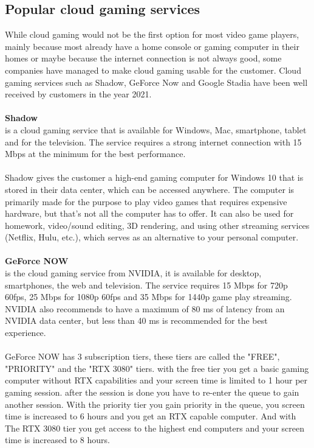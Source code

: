 \subsection{Popular cloud gaming services}
While cloud gaming would not be the first option for most video game players, mainly because most already have a home console or gaming computer in their homes or maybe because the internet connection is not always good, some companies have managed to make cloud gaming usable for the customer. Cloud gaming services such as Shadow, GeForce Now and Google Stadia have been well received by customers in the year 2021.\\\\
\textbf{Shadow}\\
 is a cloud gaming service that is available for Windows, Mac, smartphone, tablet and for the television. The service requires a strong internet connection with 15 Mbps at the minimum for the best performance.\\\\
Shadow gives the customer a high-end gaming computer for Windows 10 that is stored in their data center, which can be accessed anywhere. The computer is primarily made for the purpose to play video games that requires expensive hardware, but that's not all the computer has to offer. It can also be used for homework, video/sound editing, 3D rendering, and using other streaming services (Netflix, Hulu, etc.), which serves as an alternative to your personal computer.\\\\
\textbf{GeForce NOW}\\
 is the cloud gaming service from NVIDIA, it is available for desktop, smartphones, the web and television. The service requires 15 Mbps for 720p 60fps, 25 Mbps for 1080p 60fps and 35 Mbps for 1440p game play streaming. NVIDIA also recommends to have a maximum of 80 ms of latency from an NVIDIA data center, but less than 40 ms is recommended for the best experience.\\\\
GeForce NOW has 3 subscription tiers, these tiers are called the "FREE", "PRIORITY" and the "RTX 3080" tiers. with the free tier you get a basic gaming computer without RTX capabilities and your screen time is limited to 1 hour per gaming session. after the session is done you have to re-enter the queue to gain another session. With the priority tier you gain priority in the queue, you screen time is increased to 6 hours and you get an RTX capable computer. And with The RTX 3080 tier you get access to the highest end computers and your screen time is increased to 8 hours.
